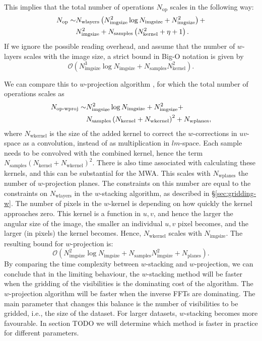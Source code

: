 \documentclass[useAMS,usenatbib]{mn2e}
\begin{document}
This implies that the total number of operations $N_\textrm{op}$ scales in the following way:
\begin{align} \notag
 N_\textrm{op} \sim & N_\textrm{wlayers} \left( N^2_\textrm{imgsize} \log N_\textrm{imgsize} + N^2_\textrm{imgsize} \right) + \\
 & N^2_\textrm{imgsize} + N_\textrm{samples} \left( N^2_\textrm{kernel} + {\eta} + 1 \right).
\end{align}
If we ignore the possible reading overhead, and assume that the number of $w$-layers scales with the image size, a strict bound in Big-O notation is given by
\begin{equation}
\mathcal{O}\left(N^3_\textrm{imgsize} \log N_\textrm{imgsize} + N_\textrm{samples} N^2_\textrm{kernel}\right).
\end{equation}

We can compare this to $w$-projection algorithm \citep{wprojection-cornwell}, for which the total number of operations scales as
\begin{align} \notag
 N_\textrm{op-wproj} \sim & N^2_\textrm{imgsize} \log N_\textrm{imgsize} + N^2_\textrm{imgsize} + \\
 & N_\textrm{samples} \left( N_\textrm{kernel} + N_\textrm{wkernel} \right)^2 + N_\textrm{wplanes},
\end{align}
where $N_\textrm{wkernel}$ is the size of the added kernel to correct the $w$-corrections in $uv$-space as a convolution, instead of as multiplication in $lm$-space. Each sample needs to be convolved with the combined kernel, hence the term $N_\textrm{samples} \left( N_\textrm{kernel} + N_\textrm{wkernel} \right)^2$. There is also time associated with calculating these kernels, and this can be substantial for the MWA. This scales with $N_\textrm{wplanes}$ the number of $w$-projection planes. The constraints on this number are equal to the constraints on $N_\textrm{wlayers}$ in the $w$-stacking algorithm, as described in \S\ref{sec:gridding-w}. The number of pixels in the $w$-kernel is depending on how quickly the kernel approaches zero. This kernel is a function in $u,v$, and hence the larger the angular size of the image, the smaller an individual $u,v$ pixel becomes, and the larger (in pixels) the kernel becomes. Hence, $N_\textrm{wkernel}$ scales with $N_\textrm{imgsize}$. The resulting bound for $w$-projection is:
\begin{equation}
\mathcal{O}\left(N^2_\textrm{imgsize} \log N_\textrm{imgsize} + N_\textrm{samples} N^2_\textrm{imgsize} + N_\textrm{planes} \right).
\end{equation}
By comparing the time complexity between $w$-stacking and $w$-projection, we can conclude that in the limiting behaviour, the $w$-stacking method will be faster when the gridding of the visibilities is the dominating cost of the algorithm. The $w$-projection algorithm will be faster when the inverse FFTs are dominating. The main parameter that changes this balance is the number of visibilities to be gridded, i.e., the size of the dataset. For larger datasets, $w$-stacking becomes more favourable. In section TODO we will determine which method is faster in practice for different parameters.
\end{document}
